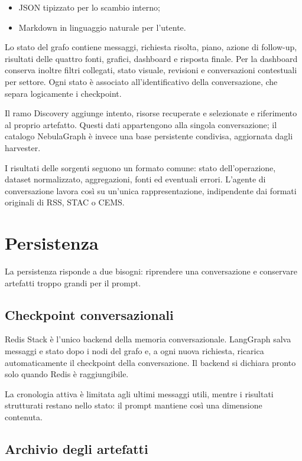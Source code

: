 \begin{itemize}
    \item JSON tipizzato per lo scambio interno;
    \item Markdown in linguaggio naturale per l'utente.
\end{itemize}

Lo stato del grafo contiene messaggi, richiesta risolta, piano, azione di
follow-up, risultati delle quattro fonti, grafici, dashboard e risposta finale.
Per la dashboard conserva inoltre filtri collegati, stato visuale, revisioni e
conversazioni contestuali per settore. Ogni stato è associato
all'identificativo della conversazione, che separa logicamente i checkpoint.

Il ramo Discovery aggiunge intento, risorse recuperate e selezionate e
riferimento al proprio artefatto. Questi dati appartengono alla singola
conversazione; il catalogo NebulaGraph è invece una base persistente condivisa,
aggiornata dagli harvester.

I risultati delle sorgenti seguono un formato comune: stato dell'operazione,
dataset normalizzato, aggregazioni, fonti ed eventuali errori. L'agente di
conversazione lavora così su un'unica rappresentazione, indipendente dai
formati originali di RSS, STAC o CEMS.

\section{Persistenza}

La persistenza risponde a due bisogni: riprendere una conversazione e
conservare artefatti troppo grandi per il prompt.

\subsection{Checkpoint conversazionali}

Redis Stack è l'unico backend della memoria conversazionale. LangGraph salva
messaggi e stato dopo i nodi del grafo e, a ogni nuova richiesta, ricarica
automaticamente il checkpoint della conversazione. Il backend si dichiara
pronto solo quando Redis è raggiungibile.

La cronologia attiva è limitata agli ultimi messaggi utili, mentre i risultati
strutturati restano nello stato: il prompt mantiene così una dimensione
contenuta.

\subsection{Archivio degli artefatti}

